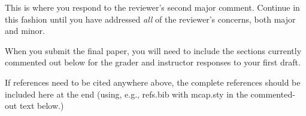 \documentclass[12pt]{article}
\newenvironment{comment}%
{\begin{quotation}\small\it\noindent\ignorespaces%
}{\end{quotation}}
\begin{document}
This is where you respond to the reviewer's second major comment. Continue in 
this fashion until you have addressed \textit{all} of the reviewer's concerns,
both major and minor.

When you submit the final paper, you will need to include the sections 
currently commented out below for the grader and instructor responses to 
your first draft.

%
%
%
%
%
%
%
%
%


If references need to be cited anywhere above, the complete references should be 
included here at the end (using, e.g., refs.bib with mcap.sty in the 
commented-out text below.)
%
% 
\end{document}

